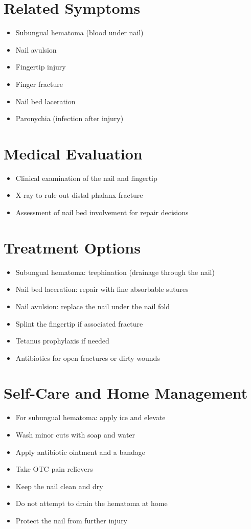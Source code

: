 \section*{Related Symptoms}
\begin{itemize}
\item Subungual hematoma (blood under nail)
\item Nail avulsion
\item Fingertip injury
\item Finger fracture
\item Nail bed laceration
\item Paronychia (infection after injury)
\end{itemize}

\section*{Medical Evaluation}
\begin{itemize}
\item Clinical examination of the nail and fingertip
\item X-ray to rule out distal phalanx fracture
\item Assessment of nail bed involvement for repair decisions
\end{itemize}

\section*{Treatment Options}
\begin{itemize}
\item Subungual hematoma: trephination (drainage through the nail)
\item Nail bed laceration: repair with fine absorbable sutures
\item Nail avulsion: replace the nail under the nail fold
\item Splint the fingertip if associated fracture
\item Tetanus prophylaxis if needed
\item Antibiotics for open fractures or dirty wounds
\end{itemize}

\section*{Self-Care and Home Management}
\begin{itemize}
\item For subungual hematoma: apply ice and elevate
\item Wash minor cuts with soap and water
\item Apply antibiotic ointment and a bandage
\item Take OTC pain relievers
\item Keep the nail clean and dry
\item Do not attempt to drain the hematoma at home
\item Protect the nail from further injury
\end{itemize}

